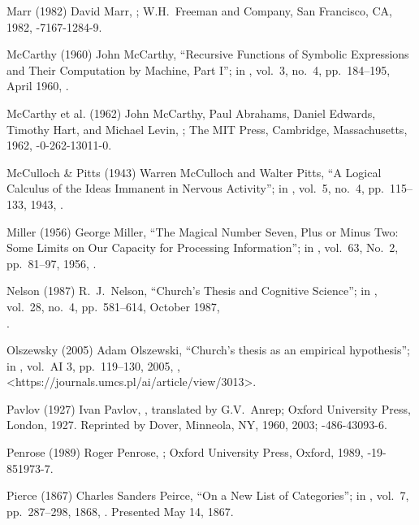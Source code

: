  Marr (1982)
David Marr,
;
W.H.\ Freeman and Company, San Francisco, CA, 1982,
-7167-1284-9.

 McCarthy (1960)
John McCarthy,
``Recursive Functions of Symbolic Expressions
and Their Computation by Machine, Part I'';
in ,
vol.\ 3, no.\ 4, pp.\ 184--195, April 1960,
.

 McCarthy et al. (1962)
John McCarthy, Paul Abrahams, Daniel Edwards,
Timothy Hart, and Michael Levin,
 ;
The MIT Press,
Cambridge, Massachusetts, 1962,
-0-262-13011-0.

 McCulloch \& Pitts (1943)
Warren McCulloch and Walter Pitts,
``A Logical Calculus of the Ideas Immanent in Nervous Activity'';
in ,
vol.\ 5, no.\ 4, pp.\ 115--133, 1943,
.

 Miller (1956)
 George Miller,
``The Magical Number Seven, Plus or Minus Two:
Some Limits on Our Capacity for Processing Information'';
in ,
vol.\ 63, No.\ 2, pp.\ 81--97, 1956,
.

 Nelson (1987)
R.\ J.\ Nelson,
``Church's Thesis and Cognitive Science'';
in ,
vol.\ 28, no.\ 4, pp.\ 581--614, October 1987,\\
.

 Olszewsky (2005)
Adam Olszewski,
``Church's thesis as an empirical hypothesis'';
in ,
vol.\ AI 3, pp.\ 119--130, 2005,
,
\URL<https://journals.umcs.pl/ai/article/view/3013>.

 Pavlov (1927)
Ivan Pavlov,
,
translated by G.V.\ Anrep;
Oxford University Press, London, 1927.
Reprinted by Dover, Minneola, NY, 1960, 2003;
-486-43093-6.

 Penrose (1989)
Roger Penrose, \negthinspace
{};
Oxford University Press, Oxford, 1989,
-19-851973-7.

 Pierce (1867)
Charles Sanders Peirce,
``On a New List of Categories'';
in ,
vol.\ 7, pp.\ 287--298, 1868,
.
Presented May 14, 1867.

